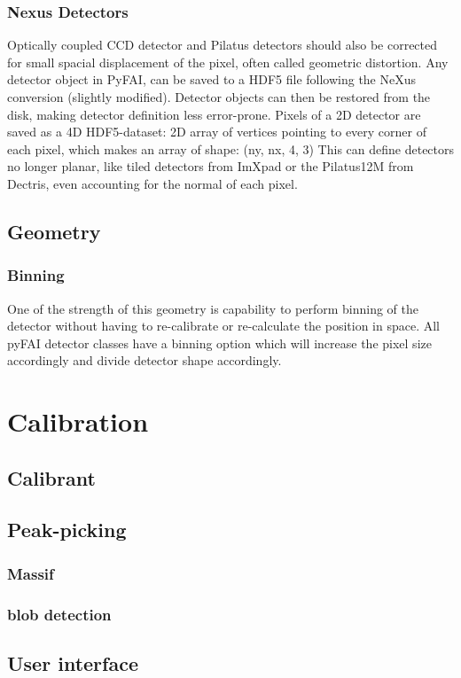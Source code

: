 \documentclass[preprint]{iucr}
\begin{document}
\subsubsection{Nexus Detectors}
Optically coupled CCD detector and Pilatus detectors should also be corrected
for small spacial displacement of the pixel, often called geometric distortion. 
Any detector object in PyFAI, can be saved to a HDF5 file
following the NeXus conversion (slightly modified).
Detector objects can then be restored from the disk, making detector definition
less error-prone.
Pixels of a 2D detector are saved as a 4D HDF5-dataset: 2D array of vertices
pointing to every corner of each pixel, which makes an array of shape: (ny, nx, 4, 3)
This can define detectors no longer planar, like tiled detectors from 
ImXpad or the Pilatus12M from Dectris, even accounting for the normal of each
pixel.

\subsection{Geometry}

\subsubsection{Binning}
One of the strength of this geometry is capability to perform binning of the
detector without having to re-calibrate or re-calculate the position in space.
All pyFAI detector classes have a binning option which will increase the pixel
size accordingly and divide detector shape accordingly.
\section{Calibration}
\subsection{Calibrant}
\subsection{Peak-picking}
\subsubsection{Massif}
\subsubsection{blob detection}
\subsection{User interface}
\end{document}
